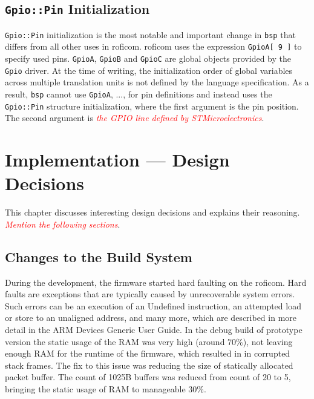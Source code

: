 \documentclass[
  digital,     %
  oneside,     %
  nosansbold,  %
  nocolorbold, %
  nolof,         %
  nolot,         %
]{fithesis4}
\newcommand{\TODO}[1]{\textcolor{red}{\textit{#1}}}
\newcommand{\TODOLIST}[1]{}
\begin{document}
{{{\section[ Gpio::Pin Initialization ]{ \lstinline|Gpio::Pin| Initialization }
\lstinline{Gpio::Pin} initialization is the most notable and important change in \lstinline{bsp} that differs from all other uses in \acrshort{roficom}. \acrshort{roficom} uses the expression \lstinline{GpioA[ 9 ]} to specify used pins. \lstinline{GpioA}, \lstinline{GpioB} and \lstinline{GpioC} are global objects provided by the \lstinline{Gpio} driver. At the time of writing, the initialization order of global variables across multiple translation units is not defined by the language specification. As a result, \lstinline{bsp} cannot use \lstinline{GpioA}, ..., for pin definitions and instead uses the \lstinline{Gpio::Pin} structure initialization, where the first argument is the pin position. The second argument is \TODO{the GPIO line defined by STMicroelectronics}.

\chapter{ Implementation --- Design Decisions } \label{ch:design}
This chapter discusses interesting design decisions and explains their reasoning. \TODO{Mention the following sections}.

\section{ Changes to the Build System }
\TODOLIST{
\begin{itemize}
    \item static buffer vs ram
    \item Hard fault = ram had too high static usage, minimizing the usage by lower the number of available buckets for packets solved this (memory::pool)
\end{itemize}
}

During the development, the firmware started hard faulting on the \acrshort{roficom}. Hard faults are exceptions that are typically caused by unrecoverable system errors. Such errors can be an execution of an Undefined instruction, an attempted load or store to an unaligned address, and many more, which are described in more detail in the ARM Devices Generic User Guide. In the debug build of prototype version the static usage of the RAM was very high (around $70\%$), not leaving enough RAM for the runtime of the firmware, which resulted in in corrupted stack frames. The fix to this issue was reducing the size of statically allocated packet buffer. The count of 1025B buffers was reduced from count of 20 to 5, bringing the static usage of RAM to manageable $30\%$.

}}}
\end{document}
